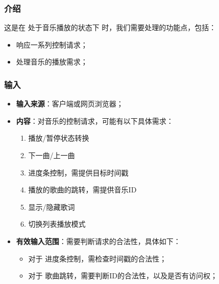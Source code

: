\subsubsection{介绍}
	这是在 处于音乐播放的状态下 时，我们需要处理的功能点，包括：
	\begin{itemize}
		\item 响应一系列控制请求；
		\item 处理音乐的播放需求；
	\end{itemize}
\subsubsection{输入}
	\begin{itemize}
		\item \textbf{输入来源}：客户端或网页浏览器；
		\item \textbf{内容}：对音乐的控制请求，可能有以下具体需求：
		\begin{enumerate}
			\item 播放/暂停状态转换
			\item 下一曲/上一曲
			\item 进度条控制，需提供目标时间戳
			\item 播放的歌曲的跳转，需提供音乐ID
			\item 显示/隐藏歌词
			\item 切换列表播放模式
		\end{enumerate}
		\item \textbf{有效输入范围}：需要判断请求的合法性，具体如下：
		\begin{itemize}
			\item 对于 进度条控制，需检查时间戳的合法性；
			\item 对于 歌曲跳转，需要判断ID的合法性，以及是否有访问权； 
		\end{itemize}
	\end{itemize}
